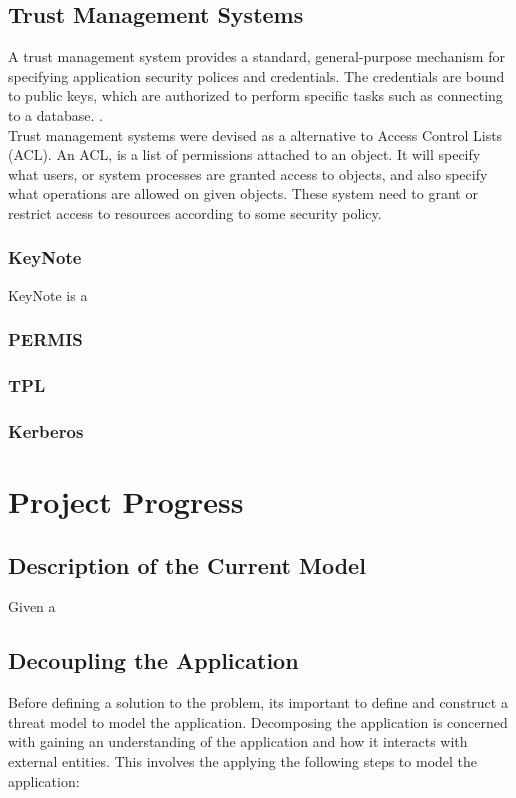 \documentclass[11pt, a4paper, twoside, notitlepage]{article}
\begin{document}
\subsection*{Trust Management Systems}
A trust management system provides a standard, general-purpose mechanism for specifying application security polices and credentials.
The credentials are bound to public keys, which are authorized to perform specific tasks such as connecting to a database. \cite{blaze1999keynote}. \\

Trust management systems were devised as a alternative to Access Control Lists (ACL). An ACL, is a list of permissions attached to an object. It will specify what users, or system processes are granted access to objects, and also specify what operations are allowed on given objects. \cite{acl-rfc} These system need to grant or restrict access to resources according to some security policy. 

\subsubsection*{KeyNote}
KeyNote is a 
\subsubsection*{PERMIS}
\subsubsection*{TPL}
\subsubsection*{Kerberos}

\makeblankpage

\section{Project Progress}
\subsection*{Description of the Current Model}
Given a 



\subsection*{Decoupling the Application}
Before defining a solution to the problem, its important to define and construct a threat model to model the application. Decomposing the application is concerned with gaining an understanding of the application and how it interacts with external entities. This involves the applying the following steps to model the application:  
\end{document}
